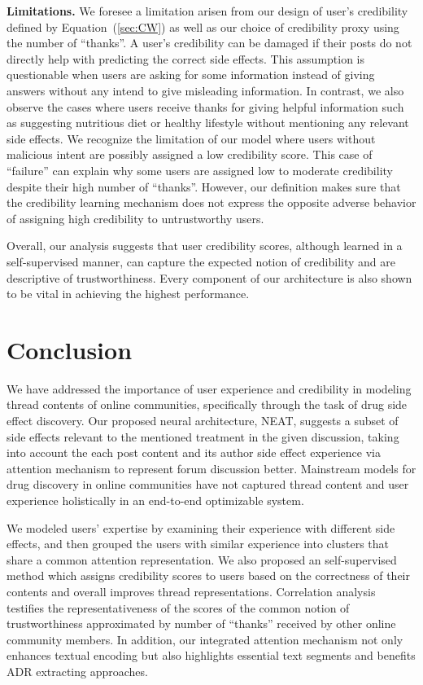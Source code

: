 \documentclass{bmcart}
\begin{document}
{\bf Limitations.} We foresee a limitation arisen from our design of user's credibility defined by Equation~(\ref{sec:CW}) as well as our choice of credibility proxy using the number of ``thanks''. A user's credibility can be damaged if their posts do not directly help with predicting the correct side effects. 
This assumption is questionable when users are asking for some information instead of giving answers without any intend to give misleading information. 
In contrast, we also observe the cases where users receive thanks for giving helpful information such as suggesting nutritious diet or healthy lifestyle without mentioning any relevant side effects. We recognize the limitation of our model where users without malicious intent are possibly assigned a low credibility score. This case of ``failure'' can explain why some users are assigned low to moderate credibility despite their high number of ``thanks''. However, our definition makes sure that the credibility learning mechanism does not express the opposite adverse behavior of assigning high credibility to untrustworthy users.

Overall, our analysis suggests that user credibility scores, although learned in a self-supervised manner, can capture the expected notion of credibility and are descriptive of trustworthiness. Every component of our architecture is also shown to be vital in achieving the highest performance.

\section{Conclusion}
We have addressed the importance of user experience and credibility in
modeling thread contents of online communities, specifically through
the task of drug side effect discovery. 
Our proposed neural architecture, NEAT, suggests a subset of side effects relevant to 
the mentioned treatment in the given discussion, 
taking into account the each post content and its
author side effect experience via attention mechanism to represent forum discussion better. Mainstream models for drug discovery in online communities have not captured thread content and user experience holistically in an end-to-end optimizable system.

We modeled users' expertise by examining their experience with different side effects, and then grouped the users with similar experience into clusters that
share a common attention representation. We also proposed an self-supervised method which assigns credibility scores to users based on the correctness of their contents and overall improves thread representations. Correlation analysis testifies the representativeness of the scores of the common notion of trustworthiness approximated by number of ``thanks'' received by other online community members. In addition, our integrated attention mechanism not only enhances textual encoding but also highlights essential text segments and benefits ADR extracting approaches.
\end{document}
